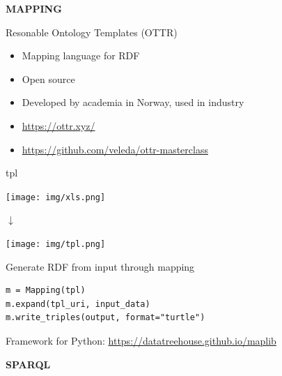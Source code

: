 \documentclass{dt}
\begin{document}
\begin{frame}
\Huge{\textbf{MAPPING}}
\end{frame}

\begin{frame}{Resonable Ontology Templates (OTTR)}
\begin{itemize}
\item Mapping language for RDF
\item Open source
\item Developed by academia in Norway, used in industry
\item[\faGlobe{}] \url{https://ottr.xyz/}
\item[\faGithub{}] \url{https://github.com/veleda/ottr-masterclass}
\end{itemize}
\end{frame}

\begin{frame}{tpl}
\begin{center}
\texttt{[image: img/xls.png]}

\vspace{5pt}

$\downarrow$

\vspace{5pt}

\texttt{[image: img/tpl.png]}
\end{center}
\end{frame}

\begin{frame}[fragile]{Generate RDF from input through mapping}
\begin{code}
\begin{verbatim}
m = Mapping(tpl)
m.expand(tpl_uri, input_data)
m.write_triples(output, format="turtle")
\end{verbatim}
\end{code}

\vspace{10pt}

Framework for Python: \url{https://datatreehouse.github.io/maplib}

\end{frame}


\begin{frame}
\Huge{\textbf{SPARQL}}
\end{frame}
\end{document}
